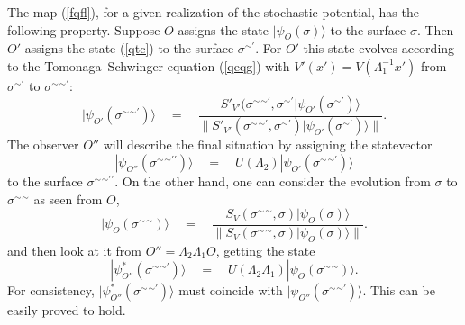 \documentclass[10pt,a4paper]{article}
\begin{document}
The map (\ref{fqfl}), for a given realization of the stochastic
potential, has the following property. Suppose $O$ assigns the
state $|\psi_{O}(\sigma)\rangle$ to the surface $\sigma$. Then
$O'$ assigns the state (\ref{qtc}) to the surface
$\sigma{}^{\sim\prime}$. For $O'$ this state evolves according to
the Tomonaga--Schwinger equation (\ref{qeqg}) with $V'(x') =
V(\Lambda_{1}^{-1}x')$ from $\sigma{}^{\sim\prime}$ to
$\sigma{}^{\sim}{}^{\sim\prime}$:
\begin{equation}
|\psi_{O'}(\sigma{}^{\sim}{}^{\sim\prime})\rangle \quad = \quad
\frac{ {S'}_{V'}(\sigma{}^{\sim}{}^{\sim\prime},
\sigma{}^{\sim\prime} |\psi_{O'}(\sigma{}^{\sim\prime})\rangle}{\|
{S'}_{V'}(\sigma{}^{\sim}{}^{\sim\prime}, \sigma{}^{\sim\prime})
|\psi_{O'}(\sigma{}^{\sim\prime})\rangle\|}.
\end{equation}
The observer $O''$ will describe the final situation by assigning
the statevector
\begin{equation}
|\psi_{O''}(\sigma{}^{\sim}{}^{\sim\prime\prime})\rangle \quad =
\quad U(\Lambda_{2})
|\psi_{O'}(\sigma{}^{\sim}{}^{\sim\prime})\rangle
\end{equation}
to the surface $\sigma{}^{\sim}{}^{\sim\prime\prime}$. On the
other hand, one can consider the evolution from $\sigma$ to
$\sigma{}^{\sim}{}^{\sim}$ as seen from $O$,
\begin{equation}
|\psi_{O}(\sigma{}^{\sim}{}^{\sim})\rangle \quad = \quad \frac{
S_{V}(\sigma{}^{\sim}{}^{\sim}, \sigma)
|\psi_{O}(\sigma)\rangle}{\| S_{V}(\sigma{}^{\sim}{}^{\sim},
\sigma) |\psi_{O}(\sigma)\rangle\|}.
\end{equation}
and then look at it from $O'' = \Lambda_{2}\Lambda_{1} O$, getting
the state
\begin{equation}
|\psi^{*}_{O''}(\sigma{}^{\sim}{}^{\sim\prime})\rangle \quad =
\quad U(\Lambda_{2}\Lambda_{1})
|\psi_{O}(\sigma{}^{\sim}{}^{\sim})\rangle.
\end{equation}
For consistency,
$|\psi^{*}_{O''}(\sigma{}^{\sim}{}^{\sim\prime})\rangle$ must
coincide with
$|\psi_{O''}(\sigma{}^{\sim}{}^{\sim\prime})\rangle$. This can be
easily proved to hold.
\end{document}
